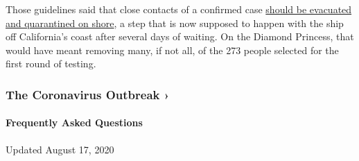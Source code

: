 Those guidelines said that close contacts of a confirmed case
\href{https://www.healthygateways.eu/Portals/0/plcdocs/Flow_chart_Ships_3_2_2020.pdf}{should
be evacuated and quarantined on shore}, a step that is now supposed to
happen with the ship off California's coast after several days of
waiting. On the Diamond Princess, that would have meant removing many,
if not all, of the 273 people selected for the first round of testing.

\href{https://www.nytimes3xbfgragh.onion/news-event/coronavirus?action=click\&pgtype=Article\&state=default\&region=MAIN_CONTENT_3\&context=storylines_faq}{}

\hypertarget{the-coronavirus-outbreak-}{%
\subsubsection{The Coronavirus Outbreak
›}\label{the-coronavirus-outbreak-}}

\hypertarget{frequently-asked-questions}{%
\paragraph{Frequently Asked
Questions}\label{frequently-asked-questions}}

Updated August 17, 2020

